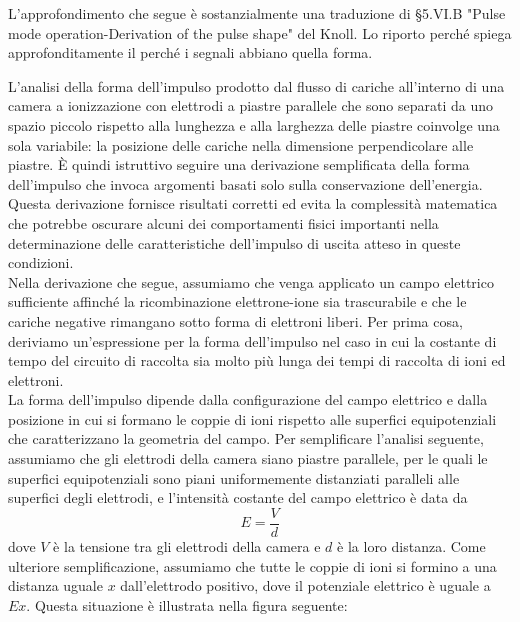 \begin{approfondimento}
   \footnotesize
   L'approfondimento che segue è sostanzialmente una traduzione di \S 5.VI.B "Pulse mode operation-Derivation of the pulse shape" del Knoll. Lo riporto perché spiega approfonditamente il perché i segnali abbiano quella forma.

   L'analisi della forma dell'impulso prodotto dal flusso di cariche all'interno di una camera a ionizzazione con elettrodi a piastre parallele che sono separati da uno spazio piccolo rispetto alla lunghezza e alla larghezza delle piastre coinvolge una sola variabile: la posizione delle cariche nella dimensione perpendicolare alle piastre. È quindi istruttivo seguire una derivazione semplificata della forma dell'impulso che invoca argomenti basati solo sulla conservazione dell'energia. Questa derivazione fornisce risultati corretti ed evita la complessità matematica che potrebbe oscurare alcuni dei comportamenti fisici importanti nella determinazione delle caratteristiche dell'impulso di uscita atteso in queste condizioni.\\
   Nella derivazione che segue, assumiamo che venga applicato un campo elettrico sufficiente affinché la ricombinazione elettrone-ione sia trascurabile e che le cariche negative rimangano sotto forma di elettroni liberi. Per prima cosa, deriviamo un'espressione per la forma dell'impulso nel caso in cui la costante di tempo del circuito di raccolta sia molto più lunga dei tempi di raccolta di ioni ed elettroni.\\
   La forma dell'impulso dipende dalla configurazione del campo elettrico e dalla posizione in cui si formano le coppie di ioni rispetto alle superfici equipotenziali che caratterizzano la geometria del campo. Per semplificare l'analisi seguente, assumiamo che gli elettrodi della camera siano piastre parallele, per le quali le superfici equipotenziali sono piani uniformemente distanziati paralleli alle superfici degli elettrodi, e l'intensità costante del campo elettrico è data da
   \begin{equation*}
      E=\frac{V}{d}
   \end{equation*}
   dove $V$ è la tensione tra gli elettrodi della camera e $d$ è la loro distanza. Come ulteriore semplificazione, assumiamo che tutte le coppie di ioni si formino a una distanza uguale $x$ dall'elettrodo positivo, dove il potenziale elettrico è uguale a $Ex$. Questa situazione è illustrata nella figura seguente:
   \begin{figure}[H]

\end{figure}
\end{approfondimento}
